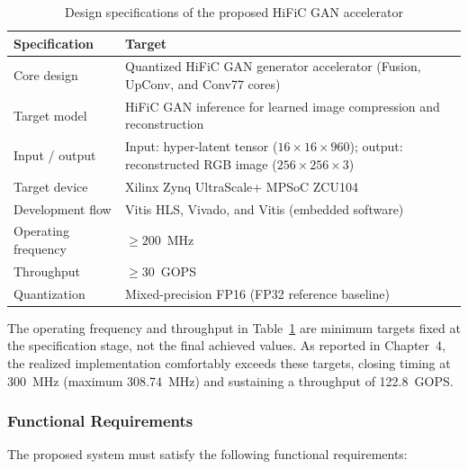 \begin{table}[H]
\centering
\caption{Design specifications of the proposed HiFiC GAN accelerator}
\label{tab:design_specs}
\begin{tabularx}{\textwidth}{|>{\raggedright\arraybackslash}p{}|X|}
\hline
\textbf{Specification} & \textbf{Target} \\
\hline
Core design & Quantized HiFiC GAN generator accelerator (Fusion, UpConv, and Conv77 cores) \\
\hline
Target model & HiFiC GAN inference for learned image compression and reconstruction \\
\hline
Input / output & Input: hyper-latent tensor ($16 \times 16 \times 960$); output: reconstructed RGB image ($256 \times 256 \times 3$) \\
\hline
Target device & Xilinx Zynq UltraScale+ MPSoC ZCU104 \\
\hline
Development flow & Vitis HLS, Vivado, and Vitis (embedded software) \\
\hline
Operating frequency & $\geq 200$~MHz \\
\hline
Throughput & $\geq 30$~GOPS \\
\hline
Quantization & Mixed-precision FP16 (FP32 reference baseline) \\
\hline
\end{tabularx}
\end{table}

The operating frequency and throughput in Table~\ref{tab:design_specs} are minimum targets fixed at the specification stage, not the final achieved values. As reported in Chapter~4, the realized implementation comfortably exceeds these targets, closing timing at 300~MHz (maximum 308.74~MHz) and sustaining a throughput of 122.8~GOPS.

\subsubsection{Functional Requirements}

The proposed system must satisfy the following functional requirements:

